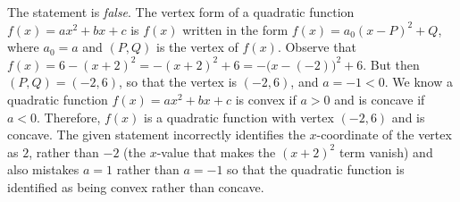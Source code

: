 \documentclass[11pt,letterpaper]{article}
\begin{document}
\sol The statement is \textit{false}. The vertex form of a quadratic function $f(x)= ax^2 + bx + c$ is $f(x)$ written in the form $f(x)= a_0(x - P)^2 + Q$, where $a_0= a$ and $(P, Q)$ is the vertex of $f(x)$. Observe that $f(x)= 6 - (x + 2)^2= -(x + 2)^2 + 6= -\big(x - (-2) \big)^2 + 6$. But then $(P, Q)= (-2, 6)$, so that the vertex is $(-2, 6)$, and $a= -1 < 0$. We know a quadratic function $f(x)= ax^2 + bx + c$ is convex if $a > 0$ and is concave if $a < 0$. Therefore, $f(x)$ is a quadratic function with vertex $(-2, 6)$ and is concave. The given statement incorrectly identifies the $x$-coordinate of the vertex as $2$, rather than $-2$ (the $x$-value that makes the $(x + 2)^2$ term vanish) and also mistakes $a= 1$ rather than $a= -1$ so that the quadratic function is identified as being convex rather than concave. 
\end{document}
